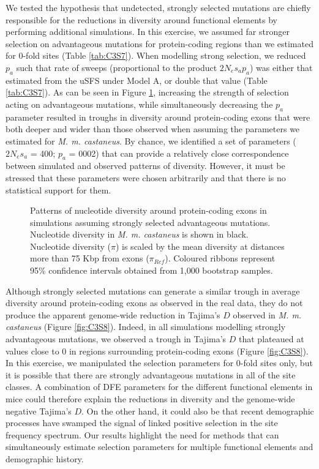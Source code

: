 	We tested the hypothesis that undetected, strongly selected mutations are chiefly responsible for the reductions in diversity around functional elements by performing additional simulations. In this exercise, we assumed far stronger selection on advantageous mutations for protein-coding regions than we estimated for 0-fold sites (Table \ref{tab:C3S7}). When modelling strong selection, we reduced $p_a$ such that rate of sweeps (proportional to the product $2N_es_ap_a$) was either that estimated from the uSFS under Model A, or double that value (Table \ref{tab:C3S7}). As can be seen in Figure \ref{fig:strongSelection}, increasing the strength of selection acting on advantageous mutations, while simultaneously decreasing the $p_a$ parameter resulted in troughs in diversity around protein-coding exons that were both deeper and wider than those observed when assuming the parameters we estimated for \textit{M. m. castaneus}. By chance, we identified a set of parameters ($2N_es_a$ = 400; $p_a$ = 0002) that can provide a relatively close correspondence between simulated and observed patterns of diversity. However, it must be stressed that these parameters were chosen arbitrarily and that there is no statistical support for them.

\begin{figure}[H]
   \centering      
   \noindent{}
 \caption[Reductions in diversity around exons caused by strong positive selection]{Patterns of nucleotide diversity around protein-coding exons in simulations assuming strongly selected advantageous mutations. Nucleotide diversity in \textit{M. m. castaneus} is shown in black. Nucleotide diversity ($\pi$) is scaled by the mean diversity at distances more than 75 Kbp from exons ($\pi_{Ref}$). Coloured ribbons represent 95\% confidence intervals obtained from 1,000 bootstrap samples.}
 \label{fig:strongSelection}
\end{figure}

	Although strongly selected mutations can generate a similar trough in average diversity around protein-coding exons as observed in the real data, they do not produce the apparent genome-wide reduction in Tajima's $D$ observed in \textit{M. m. castaneus} (Figure \ref{fig:C3S8}). Indeed, in all simulations modelling strongly advantageous mutations, we observed a trough in Tajima's $D$ that plateaued at values close to 0 in regions surrounding protein-coding exons (Figure \ref{fig:C3S8}). In this exercise, we manipulated the selection parameters for 0-fold sites only, but it is possible that there are strongly advantageous mutations in all of the site classes. A combination of DFE parameters for the different functional elements in mice could therefore explain the reductions in diversity and the genome-wide negative Tajima's $D$. On the other hand, it could also be that recent demographic processes have swamped the signal of linked positive selection in the site frequency spectrum.  Our results highlight the need for methods that can simultaneously estimate selection parameters for multiple functional elements and demographic history. 

